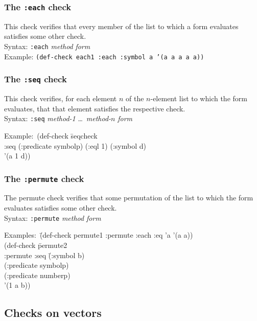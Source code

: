 \documentclass{article}
\begin{document}
\subsubsection{The \texttt{:each} check} 
This check verifies that every member of the list to which a form
evaluates satisfies some other check.
\\ Syntax: \texttt{:each} \textit{method} \textit{form}
\\ Example: \texttt{(def-check each1 :each :symbol a '(a a a a a))}

\subsubsection{The \texttt{:seq} check} 
This check verifies, for each element $n$ of the $n$-element list to
which the form evaluates, that that element satisfies the respective
check.
\\ Syntax: \texttt{:seq} \textit{method-1} \ldots\ \textit{method-$n$} \textit{form}
{\ttfamily\begin{tabbing}
\textrm{Example:}\ (def-check \=seqcheck
\\ \>  :seq (:predicate symbolp) (:eql 1) (:symbol d)
\\ \>  '(a 1 d))
\end{tabbing}}

\subsubsection{The \texttt{:permute} check} 
The permute check verifies that some permutation of the list to which
the form evaluates satisfies some other check.
\\ Syntax: \texttt{:permute} \textit{method} \textit{form}
{\ttfamily\begin{tabbing}
\textrm{Examples:}\ \=(def-check permute1 :permute :each :eq 'a '(a a))
\\ \> (def-check \=permute2
\\ \> \>  :permute :seq \=(:symbol b)
\\ \> \>              \>(:predicate symbolp)
\\ \> \>              \>(:predicate numberp)
\\ \> \>'(1 a b))
\end{tabbing}}

\subsection{Checks on vectors}
\end{document}
